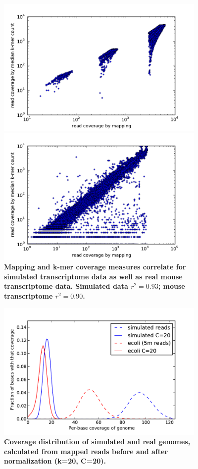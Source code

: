 \documentclass[10pt]{article}
\begin{document}
\begin{figure}[!ht]
\begin{center}
\centerline{\includegraphics[width=4in]{diginorm-sim-transcr.pdf}}
\centerline{\includegraphics[width=4in]{diginorm-mouse-transcr.pdf}}
\end{center}
\caption{
{\bf Mapping and k-mer coverage measures correlate for simulated transcriptome data as well as real mouse transcriptome data. Simulated data $r^2 = 0.93$;
mouse transcriptome $r^2 = 0.90$.}
}
\label{fig:transcripts}
\end{figure}

\begin{figure}
\centerline{\includegraphics[width=4in]{diginorm-coverage.pdf}}
\caption{
{\bf Coverage distribution of simulated and real genomes, calculated from mapped reads before and after normalization (k=20, C=20).}}
\label{fig:coverage}
\end{figure}
\end{document}
